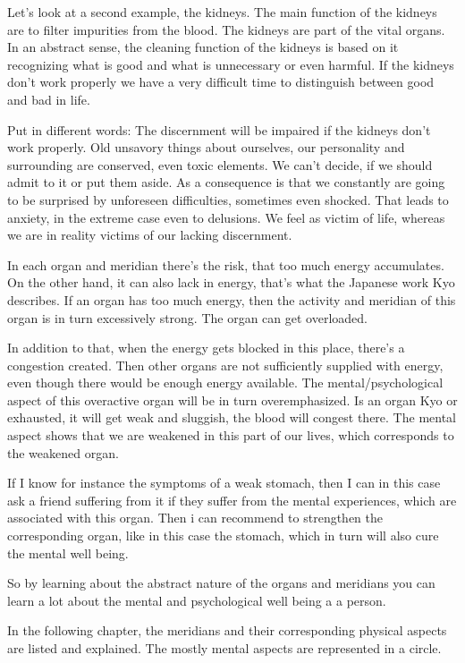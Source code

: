 \documentclass[../Book.Stress_regulation.tex]{subfiles}
\begin{document}
Let's look at a second example, the kidneys.
The main function of the kidneys are to filter impurities from the blood.
The kidneys are part of the vital organs.
In an abstract sense, the cleaning function of the kidneys is based on it recognizing what is good and what is unnecessary or even harmful.
If the kidneys don't work properly we have a very difficult time to distinguish between good and bad in life.

Put in different words: The discernment will be impaired if the kidneys don't work properly. 
Old unsavory things about ourselves, our personality and surrounding are conserved, even toxic elements.
We can't decide, if we should admit to it or put them aside.
As a consequence is that we constantly are going to be surprised by unforeseen difficulties, sometimes even shocked.
That leads to anxiety, in the extreme case even to delusions.
We feel as victim of life, whereas we are in reality victims of our lacking discernment.

In each organ and meridian there's the risk, that too much energy accumulates.
On the other hand, it can also lack in energy, that's what the Japanese work Kyo describes.
If an organ has too much energy, then the activity and meridian of this organ is in turn excessively strong.
The organ can get overloaded.

In addition to that, when the energy gets blocked in this place, there's a congestion created.
Then other organs are not sufficiently supplied with energy, even though there would be enough energy available.
The mental/psychological aspect of this overactive organ will be in turn overemphasized.
Is an organ Kyo or exhausted, it will get weak and sluggish, the blood will congest there.
The mental aspect shows that we are weakened in this part of our lives, which corresponds to the weakened organ.

If I know for instance the symptoms of a weak stomach, then I can in this case ask a friend suffering from it if they suffer from the mental experiences, which are associated with this organ.
Then i can recommend to strengthen the corresponding organ, like in this case the stomach, which in turn will also cure the mental well being.

So by learning about the abstract nature of the organs and meridians you can learn a lot about the mental and psychological well being a a person.

In the following chapter, the meridians and their corresponding physical aspects are listed and explained.
The mostly mental aspects are represented in a circle.
\end{document}
